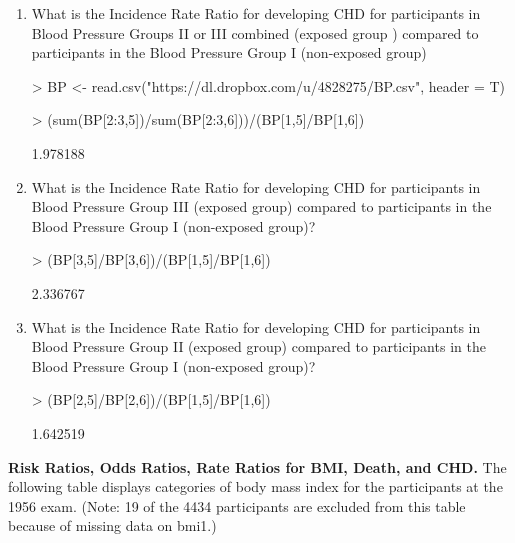 \documentclass{article}
\begin{document}
\begin{enumerate}
  \item What is the Incidence Rate Ratio for developing CHD for participants in Blood Pressure Groups II or III combined (exposed group ) compared to participants in the Blood Pressure Group I (non-exposed group)
     
\begin{Schunk}
\begin{Sinput}
> BP <- read.csv("https://dl.dropbox.com/u/4828275/BP.csv", header = T)
\end{Sinput}
\end{Schunk}

\begin{Schunk}
\begin{Sinput}
> (sum(BP[2:3,5])/sum(BP[2:3,6]))/(BP[1,5]/BP[1,6])
\end{Sinput}
\begin{Soutput}
[1] 1.978188
\end{Soutput}
\end{Schunk}

\item What is the Incidence Rate Ratio for developing CHD for participants in Blood Pressure Group III (exposed group) compared to participants in the Blood Pressure Group I (non-exposed group)? 

\begin{Schunk}
\begin{Sinput}
> (BP[3,5]/BP[3,6])/(BP[1,5]/BP[1,6])
\end{Sinput}
\begin{Soutput}
[1] 2.336767
\end{Soutput}
\end{Schunk}

\item  What is the Incidence Rate Ratio for developing CHD for participants in Blood Pressure Group II (exposed group) compared to participants in the Blood Pressure Group I (non-exposed group)? 

\begin{Schunk}
\begin{Sinput}
> (BP[2,5]/BP[2,6])/(BP[1,5]/BP[1,6])
\end{Sinput}
\begin{Soutput}
[1] 1.642519
\end{Soutput}
\end{Schunk}


\end{enumerate}
\pagebreak
\textbf{Risk Ratios, Odds Ratios, Rate Ratios for BMI, Death, and CHD.} The following table displays categories of body mass index for the participants at the 1956 exam. (Note: 19 of the 4434 participants are excluded from this table because of missing data on bmi1.)
\end{document}
